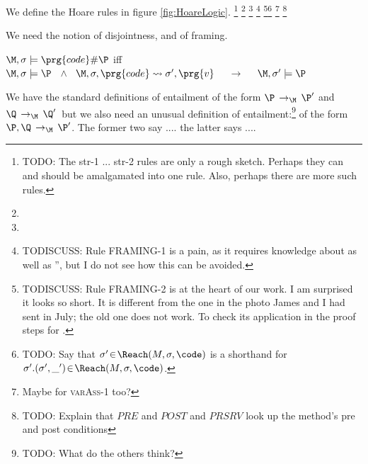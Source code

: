 We define the Hoare rules in figure
\ref{fig:HoareLogic}. \footnote{TODO: The str-1 ... str-2 rules are
  only a rough sketch. Perhaps they can and should be amalgamated into
  one rule. Also, perhaps there are more such rules.}
\footnote{}
\footnote{}
\footnote{TODISCUSS: Rule FRAMING-1 is a pain, as it requires
  knowledge about  as well as \Q'', but I do not see how
  this can be avoided. }
\footnote{TODISCUSS: Rule FRAMING-2 is at the
  heart of our work. I am surprised it looks so short. It is different
  from the one in the photo James and I had sent in July; the old one
  does not work. To check its application  in the proof steps for
  .}\footnote{TODO: Say that  $\sigma'\!\in\!\Reach(M,\sigma,\code)$ is a shorthand for $\sigma'.  (\sigma',\_')\!\in\!\Reach(M,\sigma,\code)$.}
\footnote{ Maybe for \textsc{varAss-1} too?}
\footnote{TODO: Explain that $PRE$ and $POST$ and $PRSRV$ look up the method's pre and post conditions}

We need the notion of disjointness, and of framing.
\begin{definition}[Disjointness]\label{defn:disjointness}
$ $ \\

$\M,\sigma \models \prg{code} \# \P$ iff \\
$\M,\sigma  \models \P$ \  $\wedge$ \  $\M,\sigma, \prg{code} \leadsto \sigma', \prg{v}$ \ \ $\rightarrow$ \ \ $\M,\sigma'  \models \P$
\end{definition}


We have the standard definitions of entailment of the form $\P\, \rightarrow_\M\, \P'$ and $\Q\, \rightarrow_\M\, \Q'$\, but we also need an unusual definition of entailment:\footnote{TODO: What do the others think?} of the form $\P, \Q\, \rightarrow_\M\, \P'$. The former two say .... the latter says ....

